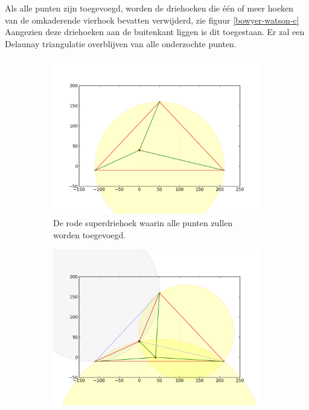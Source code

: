 Als alle punten zijn toegevoegd, worden de driehoeken die één of meer hoeken van de omkaderende vierhoek bevatten verwijderd, zie figuur \ref{bowyer-watson-c} Aangezien deze driehoeken aan de buitenkant liggen is dit toegestaan. Er zal een Delaunay triangulatie overblijven van alle onderzochte punten.

\begin{figure}
	\center
	\begin{subfigure}{0.4\textwidth}
		\includegraphics[width=\textwidth]{bowyer-watson_superdriehoek}
		\caption{De rode superdriehoek waarin alle punten zullen worden toegevoegd.}
		\label{bowyer-watson-a}
	\end{subfigure}
	\begin{subfigure}{0.4\textwidth}
		\includegraphics[width=\textwidth]{bowyer-watson_nieuwpunt}

\end{subfigure}
\end{figure}
